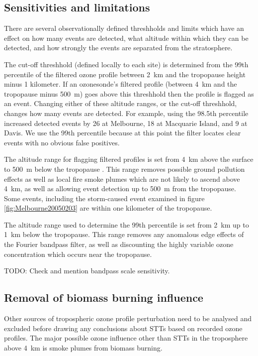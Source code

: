 \documentclass{article}
\begin{document}
  \subsection{Sensitivities and limitations}
    There are several observationally defined threshholds and limits which have an effect on how many events are detected, what altitude within which they can be detected, and how strongly the events are separated from the stratosphere.
    
    The cut-off threshhold (defined locally to each site) is determined from the 99th percentile of the filtered ozone profile between 2~km and the tropopause height minus 1 kilometer.
    If an ozonesonde's filtered profile (between 4~km and the tropopause minus 500~m) goes above this threshhold then the profile is flagged as an event.
    Changing either of these altitude ranges, or the cut-off threshhold, changes how many events are detected.
    For example, using the 98.5th percentile increased detected events by 26 at Melbourne, 18 at Macquarie Island, and 9 at Davis.
    We use the 99th percentile because at this point the filter locates clear events with no obvious false positives.
    
    The altitude range for flagging filtered profiles is set from 4~km above the surface to 500~m below the tropopause .
    This range removes possible ground pollution effects as well as local fire smoke plumes which are not likely to ascend above 4~km, as well as allowing event detection up to 500~m from the tropopause.
    Some events, including the storm-caused event examined in figure \ref{fig:Melbourne20050203} are within one kilometer of the tropopause. 
    
    The altitude range used to determine the 99th percentile is set from 2~km up to 1~km below the tropopause.
    This range removes any anomalous edge effects of the Fourier bandpass filter, as well as discounting the highly variable ozone concentration which occurs near the tropopause.
    
    TODO: Check and mention bandpass scale sensitivity.
    
  \subsection{Removal of biomass burning influence}
    
    Other sources of tropospheric ozone profile perturbation need to be analysed and excluded before drawing any conclusions about STTs based on recorded ozone profiles. 
    The major possible ozone influence other than STTs in the troposphere above 4~km is smoke plumes from biomass burning.
    
\end{document}
